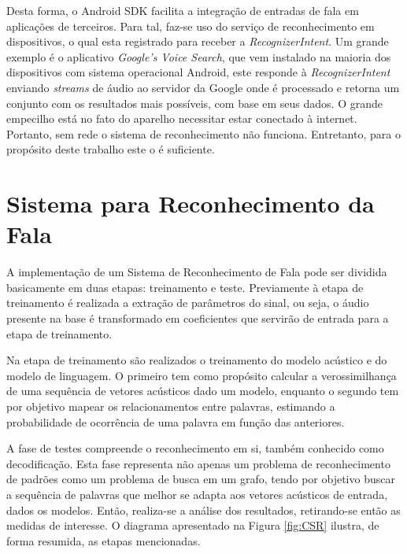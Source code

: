 \documentclass[12pt,a4paper,oneside]{report}
\begin{document}
Desta forma, o Android SDK facilita a integração de entradas de fala em aplicações de terceiros. Para tal, faz-se uso do serviço de reconhecimento em dispositivos, o qual esta registrado para receber a \emph{RecognizerIntent}\cite{recintent}. Um grande exemplo é o aplicativo \emph{Google's Voice Search}, que vem instalado na maioria dos dispositivos com sistema operacional Android, este responde à \emph{RecognizerIntent} enviando \emph{streams} de áudio ao servidor da Google onde é processado e retorna um conjunto com os resultados mais possíveis, com base em seus dados. O grande empecilho está no fato do aparelho necessitar estar conectado à internet. Portanto, sem rede o sistema de reconhecimento não funciona. Entretanto, para o propósito deste trabalho este o é suficiente.

\section{Sistema para Reconhecimento da Fala}

A implementação de um Sistema de Reconhecimento de Fala pode ser dividida basicamente em duas etapas: treinamento e teste. Previamente à etapa de treinamento é realizada a extração de parâmetros do sinal, ou seja, o áudio presente na base é transformado em coeficientes que servirão de entrada para a etapa de treinamento.

Na etapa de treinamento são realizados o treinamento do modelo acústico e do modelo de linguagem. O primeiro tem como propósito calcular a verossimilhança de uma sequência de vetores acústicos dado um modelo, enquanto o segundo tem por objetivo mapear os relacionamentos entre palavras, estimando a probabilidade de ocorrência de uma palavra em função das anteriores.

A fase de testes compreende o reconhecimento em si, também conhecido como decodificação. Esta fase representa não apenas um problema de reconhecimento de padrões como um problema de busca em um grafo, tendo por objetivo buscar a sequência de palavras que melhor se adapta aos vetores acústicos de entrada, dados os modelos. Então, realiza-se a análise dos resultados, retirando-se então as medidas de interesse. O diagrama apresentado na Figura \ref{fig:CSR} ilustra, de forma resumida, as etapas mencionadas.
\end{document}
